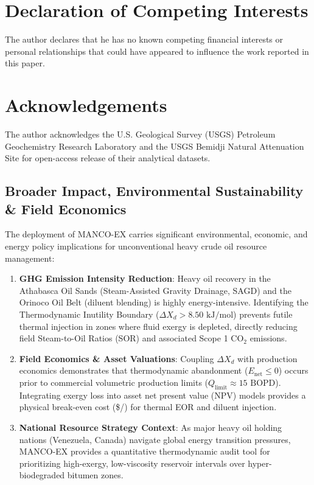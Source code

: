 \documentclass[review,12pt]{elsarticle}
\begin{document}
\section*{Declaration of Competing Interests}
The author declares that he has no known competing financial interests or personal relationships that could have appeared to influence the work reported in this paper.

\section*{Acknowledgements}
The author acknowledges the U.S. Geological Survey (USGS) Petroleum Geochemistry Research Laboratory and the USGS Bemidji Natural Attenuation Site for open-access release of their analytical datasets.

\subsection{Broader Impact, Environmental Sustainability \& Field Economics}
The deployment of MANCO-EX carries significant environmental, economic, and energy policy implications for unconventional heavy crude oil resource management:

\begin{enumerate}
    \item \textbf{GHG Emission Intensity Reduction}: Heavy oil recovery in the Athabasca Oil Sands (Steam-Assisted Gravity Drainage, SAGD) and the Orinoco Oil Belt (diluent blending) is highly energy-intensive. Identifying the Thermodynamic Inutility Boundary ($\Delta X_d > 8.50\text{ kJ/mol}$) prevents futile thermal injection in zones where fluid exergy is depleted, directly reducing field Steam-to-Oil Ratios (SOR) and associated Scope 1 $\text{CO}_2$ emissions.
    \item \textbf{Field Economics \& Asset Valuations}: Coupling $\Delta X_d$ with production economics demonstrates that thermodynamic abandonment ($E_{\text{net}} \le 0$) occurs prior to commercial volumetric production limits ($Q_{\text{limit}} \approx 15\text{ BOPD}$). Integrating exergy loss into asset net present value (NPV) models provides a physical break-even cost (\$/) for thermal EOR and diluent injection.
    \item \textbf{National Resource Strategy Context}: As major heavy oil holding nations (Venezuela, Canada) navigate global energy transition pressures, MANCO-EX provides a quantitative thermodynamic audit tool for prioritizing high-exergy, low-viscosity reservoir intervals over hyper-biodegraded bitumen zones.
\end{enumerate}
\end{document}

